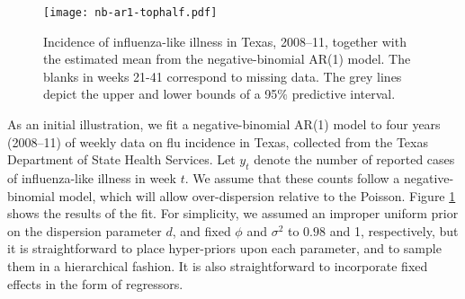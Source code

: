 \documentclass[12pt]{article}
\newcommand{\Polya}{P\'{o}lya}
\begin{document}


\begin{figure}
\begin{center}
\texttt{[image: nb-ar1-tophalf.pdf]}
\caption{\label{fig:nb-ar1} Incidence of influenza-like illness in Texas,
  2008--11, together with the estimated mean from the negative-binomial AR(1)
  model.  The blanks in weeks 21-41 correspond to missing data.  The grey lines
  depict the upper and lower bounds of a 95$\%$ predictive interval.}
\end{center}
\end{figure}

As an initial illustration, we fit a negative-binomial AR(1) model to four years
(2008--11) of weekly data on flu incidence in Texas, collected from the Texas
Department of State Health Services.  Let $y_t$ denote the number of reported
cases of influenza-like illness in week $t$.  We assume that these counts follow
a negative-binomial model, which will allow over-dispersion relative to the
Poisson.
Figure \ref{fig:nb-ar1} shows the results of the fit. For simplicity, we assumed
an improper uniform prior on the dispersion parameter $d$, and fixed $\phi$ and
$\sigma^2$ to $0.98$ and 1, respectively, but it is straightforward to place
hyper-priors upon each parameter, and to sample them in a hierarchical fashion.
It is also straightforward to incorporate fixed effects in the form of
regressors.

\end{document}
